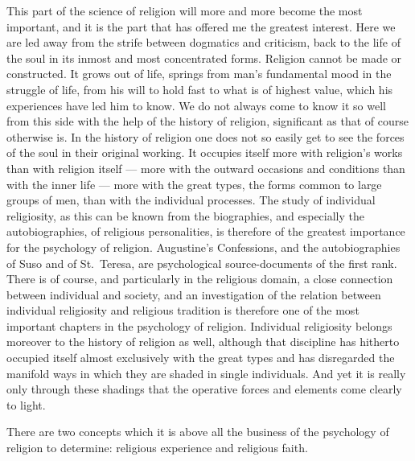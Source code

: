 \documentclass[12pt,a4paper]{article}
\newcommand{\opage}[1]{\marginnote{\footnotesize\textit{[#1]}}}
\begin{document}
This part of the science of religion will more and more become the most
important, and it is the part that has offered me the greatest interest. Here
we are led away from the strife between dogmatics and criticism, back to the
life of the soul in its inmost and most
\opage{416}concentrated forms. Religion cannot be made or constructed. It grows out of
life, springs from man's fundamental mood in the struggle of life, from his
will to hold fast to what is of highest value, which his experiences have led
him to know. We do not always come to know it so well from this side with the
help of the history of religion, significant as that of course otherwise is. In
the history of religion one does not so easily get to see the forces of the
soul in their original working. It occupies itself more with religion's works
than with religion itself --- more with the outward occasions and conditions
than with the inner life --- more with the great types, the forms common to
large groups of men, than with the individual processes. The study of
individual religiosity, as this can be known from the biographies, and
especially the autobiographies, of religious personalities, is therefore of the
greatest importance for the psychology of religion. Augustine's Confessions,
and the autobiographies of Suso and of St.\ Teresa, are psychological
source-documents of the first rank. There is of course, and particularly in the
religious domain, a close connection between individual and society, and an
investigation of the relation between individual religiosity and religious
tradition is therefore one of the most important chapters in the psychology of
religion. Individual religiosity belongs moreover to the history of religion as
well, although that discipline has hitherto occupied itself almost exclusively
with the great types and has disregarded the manifold ways in which they are
shaded in single individuals. And yet it is really only through these shadings
that the operative forces and elements come clearly to light.

There are two concepts which it is above all the business of the psychology of
religion to determine: religious experience and religious faith.
\end{document}
